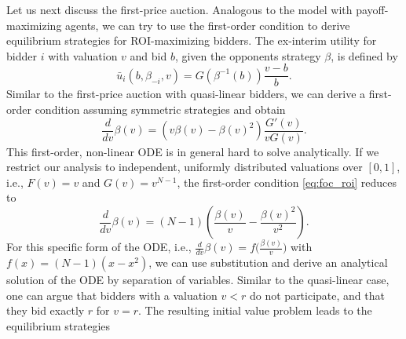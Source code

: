 \documentclass{article}
\begin{document}
Let us next discuss the first-price auction. Analogous to the model with payoff-maximizing agents, we can try to use the first-order condition to derive equilibrium strategies for ROI-maximizing bidders. The ex-interim utility for bidder $i$ with valuation $v$ and bid $b$, given the opponents strategy $\beta$, is defined by
\begin{equation} \label{eq:foc_roi}
	\bar u_i (b, \beta_{-i}, v) = G(\beta^{-1}(b)) \dfrac{v-b}{b}.
\end{equation}
Similar to the first-price auction with quasi-linear bidders, we can derive a first-order condition assuming symmetric strategies and obtain
\begin{equation}
	\frac{d}{dv} \beta(v) = \left( v \beta(v) - \beta(v)^2 \right) \dfrac{G'(v)}{vG(v)}.
\end{equation}
This first-order, non-linear ODE is in general hard to solve analytically. If we restrict our analysis to independent, uniformly distributed valuations over $[0,1]$, i.e., $F(v) = v$ and $ G(v) = v^{N-1} $, the first-order condition \eqref{eq:foc_roi} reduces to
\begin{equation}
	\dfrac{d}{dv} \beta(v) = (N-1) \left( \dfrac{\beta(v)}{v} - \dfrac{\beta(v)^2}{v^2} \right).	
\end{equation}
For this specific form of the ODE, i.e., $\tfrac{d}{dv}\beta(v) = f \big(\tfrac{\beta(v)}{v}\big)$ with $f(x) = (N-1)(x-x^2)$, we can use substitution and derive an analytical solution of the ODE by separation of variables. 
Similar to the quasi-linear case, one can argue that bidders with a valuation $v < r$ do not participate, and that they bid exactly $ r $ for $v = r$. The resulting initial value problem leads to the equilibrium strategies
\end{document}
